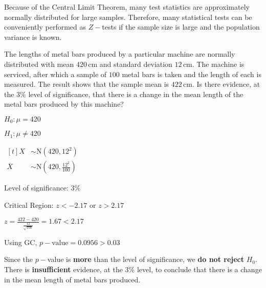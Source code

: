 \documentclass[11pt,a4paper]{book}
\begin{document}
Because of the Central Limit Theorem, many test statistics are approximately
normally distributed for large samples. Therefore, many statistical
tests can be conveniently performed as $Z-$tests if the sample size
is large and the population variance is known.

\begin{example}

The lengths of metal bars produced by a particular machine are normally
distributed with mean $420\,\text{cm}$ and standard deviation $12\,\text{cm}$.
The machine is serviced, after which a sample of $100$ metal bars
is taken and the length of each is measured. The result shows that
the sample mean is $422\,\text{cm}$. Is there evidence, at the $3\%$
level of significance, that there is a change in the mean length of
the metal bars produced by this machine?

\Solution

\begin{steps}[leftmargin=1.5cm]

\item  $H_{0}:\mu=420$

$H_{1}:\mu\neq420$

\item
$
\begin{aligned}[t]
X & \sim\text{N}\left(420,12^{2}\right)\\
\overline{X} & \sim\text{N}\left(420,\frac{12^{2}}{100}\right)
\end{aligned}
$

\item  Level of significance: $3\%$

Critical Region: $z<-2.17$ or $z>2.17$

\item  ${\displaystyle z=\frac{422-420}{\frac{12}{\sqrt{100}}}=1.67}<2.17$

\item  Using GC, $p-\text{value}=0.0956>0.03$

\item

\begin{tcolorbox}[colback=white, colframe=black,boxrule=.4pt, sharpish corners,box align=center]

Since the $p-$value is \textbf{more} than the level of significance,
we \textbf{do not reject} $H_{0}$. There is \textbf{insufficient}
evidence, at the $3\%$ level, to conclude that there is a change
in the mean length of metal bars produced.
\end{tcolorbox}

\end{steps}

\end{example}
\end{document}
